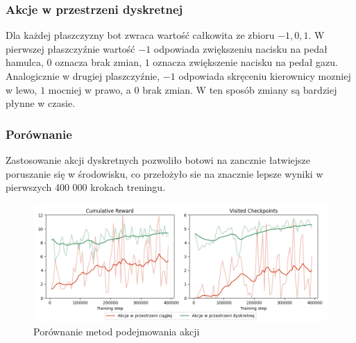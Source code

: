 \subsubsection{Akcje w przestrzeni dyskretnej}
Dla każdej płaszczyzny bot zwraca wartość całkowita ze zbioru ${-1, 0, 1}$. W pierwszej płaszczyźnie wartość $-1$ odpowiada zwiększeniu nacisku na pedał hamulca, $0$ oznacza brak zmian, $1$ oznacza zwiększenie nacisku na pedał gazu. Analogicznie w drugiej plaszczyźnie, $-1$ odpowiada skręceniu kierownicy mozniej w lewo, $1$ mocniej w prawo, a $0$ brak zmian. W ten sposób zmiany są bardziej płynne w czasie.

\subsubsection{Porównanie}
Zastosowanie akcji dyskretnych pozwoliło botowi na zancznie łatwiejsze poruszanie się w środowisku, co przełożyło sie na znacznie lepsze wyniki w pierwszych 400 000 krokach treningu.
\begin{figure}[H]
    \centering
    \includegraphics[width=\textwidth]{graphs/output_actions}
    \caption{Porównanie metod podejmowania akcji}
    \label{fig}
\end{figure}
\clearpage

